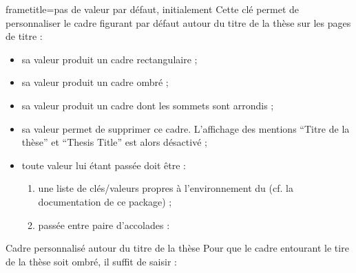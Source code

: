 {%
\begin{docKey}{frametitle}{=\textbar{}\textbar{}\textbar{}\textbar{}}{pas de valeur par défaut, initialement }
  Cette clé permet de personnaliser le cadre figurant par défaut autour du
  titre de la thèse sur les pages de titre :
  \begin{itemize}
  \item sa valeur  produit un cadre rectangulaire ;
  \item sa valeur  produit un cadre ombré ;
  \item sa valeur  produit un cadre dont les sommets sont
    arrondis ;
  \item sa valeur  permet de supprimer ce cadre. L'affichage des
    mentions \enquote{Titre de la thèse} et \foreignquote{english}{Thesis
      Title} est alors désactivé ;
  \item toute  valeur lui étant passée doit être :
    \begin{enumerate}
    \item une liste de clés/valeurs propres à l'environnement
       du  (cf. la
      documentation de ce package) ;
    \item passée entre paire d'accolades :
\begin{preamblecode}
\end{preamblecode}
    \end{enumerate}
  \end{itemize}
\end{docKey}
}

\begin{dbexample}{Cadre personnalisé autour du titre de la thèse}{}
  Pour que le cadre entourant le tire de la thèse soit ombré, il suffit de
  saisir :
\begin{preamblecode}
\maketitle[frametitle=shadowbox]
\end{preamblecode}
\end{dbexample}

